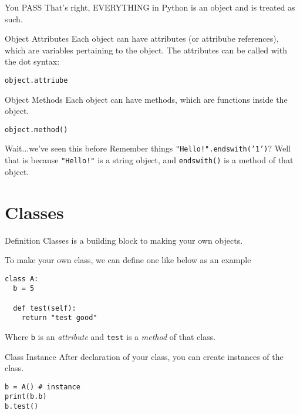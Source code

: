 \begin{frame}{You PASS}
  That's right, EVERYTHING in Python is an object and is treated as such.
\end{frame}

\begin{frame}[containsverbatim]{Object Attributes}
  Each object can have attributes (or attribube references), which are variables pertaining to the object. The attributes can be called with the dot syntax:

  \texttt{object.attriube}
\end{frame}

\begin{frame}[containsverbatim]{Object Methods}
  Each object can have methods, which are functions inside the object.

  \texttt{object.method()}
\end{frame}

\begin{frame}[containsverbatim]{Wait...we've seen this before}
  Remember things \texttt{"Hello!".endswith('1')}? Well that is because \texttt{"Hello!"} is a string object, and \texttt{endswith()} is a method of that object.
\end{frame}

\section{Classes}

\begin{frame}[containsverbatim]{Definition}
  Classes is a building block to making your own objects.

  To make your own class, we can define one like below as an example
\begin{verbatim}
class A:
  b = 5

  def test(self):
    return "test good"
\end{verbatim}

Where \verb|b| is an \textit{attribute} and \verb|test| is a \textit{method} of that class.
\end{frame}

\begin{frame}[containsverbatim]{Class Instance}
  After declaration of your class, you can create instances of the class.

\begin{verbatim}
b = A() # instance
print(b.b)
b.test()
\end{verbatim}
\end{frame}

